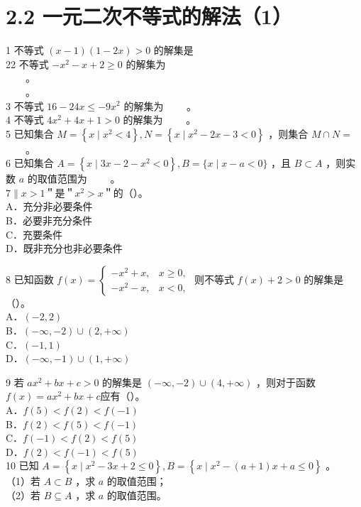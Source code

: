 \documentclass[10pt]{article}
\begin{document}
\section*{2.2 一元二次不等式的解法（1）}
1 不等式 \((x-1)(1-2 x)>0\) 的解集是\\
22 不等式 \(-x^{2}-x+2 \geqslant 0\) 的解集为\\
\(\qquad\)。\\
\(\qquad\)。\\
3 不等式 \(16-24 x \leqslant-9 x^{2}\) 的解集为 \(\qquad\)。\\
4 不等式 \(4 x^{2}+4 x+1>0\) 的解集为 \(\qquad\)。\\
5 已知集合 \(M=\left\{x \mid x^{2}<4\right\}, N=\left\{x \mid x^{2}-2 x-3<0\right\}\) ，则集合 \(M \cap N=\) \(\qquad\)。\\
6 已知集合 \(A=\left\{x \mid 3 x-2-x^{2}<0\right\}, B=\{x \mid x-a<0\}\) ，且 \(B \subset A\) ，则实数 \(a\) 的取值范围为 \(\qquad\)。\\
\(7 \| x>1\)＂是＂\(x^{2}>x\)＂的（）。\\
A．充分非必要条件\\
B．必要非充分条件\\
C．充要条件\\
D．既非充分也非必要条件

8 已知函数 \(f(x)=\left\{\begin{array}{ll}-x^{2}+x, & x \geqslant 0, \\ -x^{2}-x, & x<0,\end{array}\right.\) 则不等式 \(f(x)+2>0\) 的解集是（）。\\
A．\((-2,2)\)\\
B．\((-\infty,-2) \cup(2,+\infty)\)\\
C．\((-1,1)\)\\
D．\((-\infty,-1) \cup(1,+\infty)\)

9 若 \(a x^{2}+b x+c>0\) 的解集是 \((-\infty,-2) \cup(4,+\infty)\) ，则对于函数 \(f(x)=a x^{2}+b x+c\)应有（）。\\
A．\(f(5)<f(2)<f(-1)\)\\
B．\(f(2)<f(5)<f(-1)\)\\
C．\(f(-1)<f(2)<f(5)\)\\
D．\(f(2)<f(-1)<f(5)\)\\
10 已知 \(A=\left\{x \mid x^{2}-3 x+2 \leqslant 0\right\}, B=\left\{x \mid x^{2}-(a+1) x+a \leqslant 0\right\}\) 。\\
（1）若 \(A \subset B\) ，求 \(a\) 的取值范围；\\
（2）若 \(B \subseteq A\) ，求 \(a\) 的取值范围。
\end{document}

